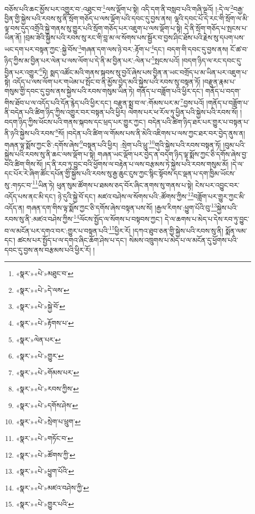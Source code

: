 བཅོས་པའི་ཆང་མྱོས་པར་འགྱུར་བ་:འཐུང་བ་\footnote{«སྣར་»«པེ་»མཐུང་བ་}ལས་ལྡོག་པ་སྟེ། འདི་དག་ནི་བསླབ་པའི་གཞི་ལྔའོ། །:དེ་ལ་\footnote{«སྣར་»«པེ་»དེ་ལས་}བརྒྱ་བྱིན་གྱི་སྐྱེས་པའི་རབས་སུ་ནི་སྲོག་གཅོད་པ་ལས་ལྡོག་པའི་དབང་དུ་བྱས་ནས། ལྷའི་དབང་པོ་དེ་རང་གི་སྲོག་ལ་མི་ལྟ་བས་དུད་འགྲོའི་སྐྱེ་གནས་སུ་གྱུར་པའི་སྲོག་གཅོད་པར་འཇུག་པ་ལས་ལྡོག་པ་སྟེ། དེ་ནི་སྲོག་གཅོད་པ་སྤངས་པ་ཡིན་ནོ། །བྲམ་ཟེའི་སྐྱེས་པའི་རབས་སུ་རང་གི་བླ་མ་ལ་སོགས་པས་སྦྱོར་བ་བྱས་ཤིང་ཐོས་པའི་རྗེས་སུ་དཔག་པས་ཡང་དག་པར་བསྟན་ཀྱང་:སྐྱེ་བོས་\footnote{«སྣར་»«པེ་»སྐྱེ་བོ་}གཞན་དག་ལས་ཉེ་བར་:རྟོག་པ་\footnote{«སྣར་»«པེ་»རྟོགས་པ་}དང་། བདག་གི་དབང་དུ་བྱས་ནས། ངོ་ཚ་བ་ཉིད་ཀྱིས་མ་བྱིན་པར་ལེན་པ་ལས་ལོག་པ་དེ་ནི་མ་བྱིན་པར་:ལེན་པ་\footnote{«སྣར་»ལེན་པར་}སྤངས་པའོ། །བདག་ཉིད་ལ་རང་དབང་དུ་བྱིན་པར་འགྱུར་\footnote{«སྣར་»«པེ་»གྱུར་}ཏེ། སྨད་འཚོང་མའི་གནས་སྐབས་སུ་བྱའོ་ཞེས་པས་བྱིན་ན་ཡང་བགྲོད་པ་མ་ཡིན་པར་འཇུག་པ་སྟེ། འདོད་པ་ལས་ལོག་པར་གཡེམ་པ་སྤོང་བ་ནི་མྱོས་བྱེད་མའི་སྐྱེས་པའི་རབས་སུ་བསྟན་ཏོ། །བརྫུན་རྣམ་པ་གསུམ་གྱི་དབང་དུ་བྱས་ནས་སྐྱེས་པའི་རབས་གསུམ་ཡིན་ཏེ། གནོད་པ་བཟློག་པའི་ཕྱིར་དང་། གནོད་པ་བདག་གིས་ཐོབ་པ་ལ་འདོད་པའི་དོན་རྙེད་པའི་ཕྱིར་དང་། བརྫུན་སྨྲ་བ་ལ་:གོམས་པར་མ་\footnote{«སྣར་»«པེ་»གོམས་པར་}བྱས་པའོ། །གནོད་པ་བཟློག་པ་ནི་བདེན་པའི་ཚིག་ཉིད་ཀྱིས་འགྱུར་བར་བསྟན་པའི་ཕྱིར། ལེགས་པར་ཕ་རོལ་ཏུ་ཕྱིན་པའི་སྐྱེས་པའི་རབས་སོ། །བདག་ཉིད་ཀྱིས་ཕོངས་པའི་གནས་སྐབས་དང་ཕྲད་པར་གྱུར་ཀྱང་། བདེན་པའི་ཚིག་ཉིད་ཐར་པར་གྱུར་པ་བསྟན་པ་ནི་ཉའི་སྐྱེས་པའི་རབས་\footnote{«སྣར་»«པེ་»རབས་ཀྱིས་}སོ། །བདེན་པའི་ཚིག་ལ་གོམས་པས་ནི་མེའི་འཇིགས་པ་ལས་ཀྱང་ཐར་བར་བྱེད་ནུས་ན། གཞན་ལྟ་སྨོས་ཀྱང་ཅི་:དགོས་ཞེས་\footnote{«སྣར་»«པེ་»དགོས་ཤེས་}བསྟན་པའི་ཕྱིར། :སྲེག་པའི་ཕྲུ་\footnote{«སྣར་»«པེ་»སྲེག་པ་ཕྲུག་}གུའི་སྐྱེས་པའི་རབས་བསྟན་ཏོ། །བུམ་པའི་སྐྱེས་པའི་རབས་སུ་ནི་ཆང་ལས་ལྡོག་པ་སྟེ། གཞན་ཡང་ལྡོག་པར་བྱེད་ན་བདག་ཉིད་ལྟ་སྨོས་ཀྱང་ཅི་དགོས་ཞེས་བྱ་བའི་ཚིག་གིས་སོ། །ད་ནི་རབ་ཏུ་བྱུང་བའི་ཕྱོགས་ལ་བརྟེན་པ་ལས་བརྩམས་ཏེ་སྐྱེས་པའི་རབས་གསུམ་མོ། །དེ་ལ་དང་པོར་རེ་ཞིག་ཚོང་དཔོན་གྱི་སྐྱེས་པའི་རབས་སུ་རྒྱ་ཆུང་ངུས་ཀྱང་སྙིང་སྟོབས་དང་ལྡན་པ་དག་ཁྱིམ་ཡོངས་སུ་:གཏང་བ་\footnote{«སྣར་»«པེ་»གཏོང་བ་}ཡིན་ཏེ། ཕུན་སུམ་ཚོགས་པ་ཐམས་ཅད་བོར་ཞིང་ནགས་སུ་གནས་པ་སྟེ། ངེས་པར་འབྱུང་བར་འདོད་པས་ནང་མི་དང་། ཉེ་དུའི་སྐྱེ་བོ་དང་། མཛའ་བཤེས་ལ་སོགས་པའི་:ཚོགས་ཀྱིས་\footnote{«སྣར་»«པེ་»ཚོགས་ཀྱི་}བཟློག་པར་གྱུར་ཀྱང་མི་འདོད་ན། གཞན་དག་གིས་ལྟ་སྨོས་ཀྱང་ཅི་དགོས་ཞེས་བསྟན་པས་སོ། །རྒྱལ་རིགས་:ཕྱུག་པོའི་བུ་\footnote{«སྣར་»«པེ་»ཕྱུག་པོའི་}སྐྱེས་པའི་རབས་སུ་ནི་:མཛའ་བཤེས་ཀྱིས་\footnote{«སྣར་»«པེ་»མཛའ་བཤེས་ཀྱི་}ལོངས་སྤྱོད་ལ་སོགས་པ་བསྟབས་ཀྱང་། དེ་ལ་ཆགས་པ་མེད་པ་དེས་རབ་ཏུ་བྱུང་བ་ལ་མངོན་པར་དགའ་བར་:གྱུར་པ་བསྟན་པའི་\footnote{«སྣར་»«པེ་»གྱུར་པའི་}ཕྱིར་རོ། །དཀའ་ཐུབ་ཅན་གྱི་སྐྱེས་པའི་རབས་སུ་ནི། སྨོན་ལམ་དང་། ཚངས་པར་སྤྱོད་པ་ལ་དགའ་ཞིང་ཆོག་ཤེས་པ་དང་། སེམས་འཁྲུགས་པ་མེད་པ་ལ་མངོན་དུ་ཕྱོགས་པའི་དབང་དུ་བྱས་ནས་བརྩམས་པའི་ཕྱིར་རོ། །
